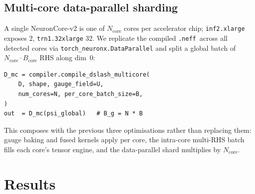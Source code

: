 \documentclass[a4paper,11pt]{article}
\newcommand{\NEFF}{\texttt{.neff}}
\begin{document}
\subsection{Multi-core data-parallel sharding}

A single NeuronCore-v2 is one of $N_{\mathrm{core}}$ cores per
accelerator chip; \texttt{inf2.xlarge} exposes 2,
\texttt{trn1.32xlarge} 32. We replicate the compiled \NEFF\ across
all detected cores via \texttt{torch\_neuronx.}\allowbreak\texttt{DataParallel} and
split a global batch of $N_{\mathrm{core}}\!\cdot\! B_{\mathrm{core}}$
RHS along dim~0:
\begin{lstlisting}
D_mc = compiler.compile_dslash_multicore(
    D, shape, gauge_field=U,
    num_cores=N, per_core_batch_size=B,
)
out  = D_mc(psi_global)   # B_g = N * B
\end{lstlisting}
This composes with the previous three optimisations rather than
replacing them: gauge baking and fused kernels apply per core, the
intra-core multi-RHS batch fills each core's tensor engine, and the
data-parallel shard multiplies by $N_{\mathrm{core}}$.

\section{Results}
\label{sec:results}
\end{document}
